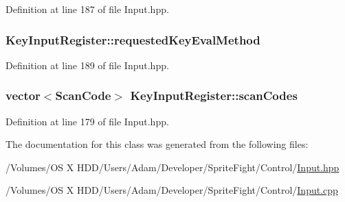 Definition at line 187 of file Input.\-hpp.

\hypertarget{class_key_input_register_a99a156d91abafbd8a1f191d15158d1ba}{
\subsubsection[{requested\-Key\-Eval\-Method}]{ Key\-Input\-Register\-::requested\-Key\-Eval\-Method\hspace{0.3cm}{\ttfamily [protected]}}}\label{class_key_input_register_a99a156d91abafbd8a1f191d15158d1ba}


Definition at line 189 of file Input.\-hpp.

\hypertarget{class_key_input_register_abc2af3b54d196eda9e64fdcd6da118d0}{
\subsubsection[{scan\-Codes}]{\setlength{\rightskip}{0pt plus 5cm}vector$<${\bf Scan\-Code}$>$ Key\-Input\-Register\-::scan\-Codes\hspace{0.3cm}{\ttfamily [protected]}}}\label{class_key_input_register_abc2af3b54d196eda9e64fdcd6da118d0}


Definition at line 179 of file Input.\-hpp.



The documentation for this class was generated from the following files\-:\begin{DoxyCompactItemize}
\item 
/\-Volumes/\-O\-S X H\-D\-D/\-Users/\-Adam/\-Developer/\-Sprite\-Fight/\-Control/\hyperlink{_input_8hpp}{Input.\-hpp}\item 
/\-Volumes/\-O\-S X H\-D\-D/\-Users/\-Adam/\-Developer/\-Sprite\-Fight/\-Control/\hyperlink{_input_8cpp}{Input.\-cpp}\end{DoxyCompactItemize}
